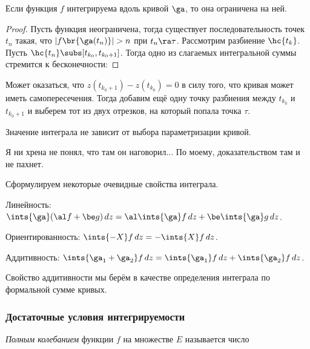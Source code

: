 \documentclass[a4paper]{article}
\begin{document}
\begin{solution}
\begin{theorem}
Если функция $f$ интегрируема вдоль кривой $\ga$, то она ограничена на ней.
\end{theorem}
\begin{proof}
Пусть функция неограничена, тогда существует последовательность точек $t_n$ такая, что ${|f\br{\ga(t_n)}|>n}$
при $t_n\ra\tau$. Рассмотрим разбиение $\hc{t_k}$. Пусть $\hc{t_n}\subs[t_{k_0},t_{k_0+1}]$.
Тогда одно из слагаемых интегральной суммы стремится к бесконечности:
\hfill\end{proof}
\begin{note}
Может оказаться, что $z(t_{k_0+1})-z(t_{k_0})=0$ в силу того, что кривая может иметь самопересечения. Тогда добавим
ещё одну точку разбиения между $t_{k_0}$ и $t_{k_0+1}$ и выберем тот из двух отрезков, на который попала точка $\tau$.
\end{note}

\begin{theorem}
Значение интеграла не зависит от выбора параметризации кривой.
\end{theorem}
\begin{petit}
Я ни хрена не понял, что там он наговорил... По моему, доказательством там и не пахнет.
\end{petit}

Сформулируем некоторые очевидные свойства интеграла.

\begin{items}{-2}
\item Линейность: $\ints{\ga}(\al f + \be g)\,dz = \al\ints{\ga}f\,dz + \be\ints{\ga}g\,dz$.

\item Ориентированность: $\ints{-X}f\,dz = -\ints{X}f\,dz$.

\item Аддитивность: $\ints{\ga_1 + \ga_2}f\,dz = \ints{\ga_1}f\,dz + \ints{\ga_2}f\,dz$.
\end{items}

Свойство аддитивности мы берём в качестве определения интеграла по формальной сумме кривых.

\subsubsection{Достаточные условия интегрируемости}

\begin{df}
\emph{Полным колебанием} функции $f$ на множестве $E$ называется число
\end{df}


\end{solution}
\end{document}
